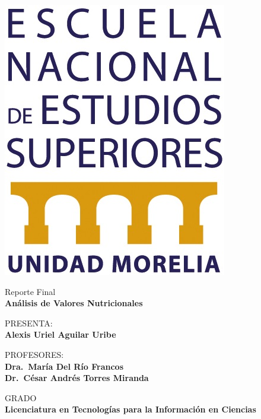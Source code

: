 \documentclass[12pt,a4paper]{article}
\begin{document}
\begin{titlepage}
\begin{minipage}[c]{0.1\textwidth}
            \includegraphics[width=\textwidth]{Resources/Cover/logo_enes.jpg}
        \end{minipage}
        \vspace{3cm}

        \centering
        {\large{Reporte Final\\}}
        {\Large\textbf{Análisis de Valores Nutricionales}}
        \vspace{2cm}

        {{PRESENTA:\\}}
        {\large\textbf{Alexis Uriel Aguilar Uribe}}
        \vspace{1cm} 

        {{PROFESORES:\\}}
        {\large\textbf{Dra.\ María Del Río Francos}}\\
        {\large\textbf{Dr.\ César Andrés Torres Miranda}}
        \vspace{2cm}

        {{GRADO\\}}
        {\large\textbf{Licenciatura en Tecnologías para la Información en Ciencias}}
        \vspace{2cm}


        \vfill
    \end{titlepage}
\end{document}

